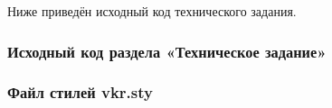 
Ниже приведён исходный код технического задания.

\subsubsection*{Исходный код раздела «Техническое задание»}



\subsubsection*{Файл стилей vkr.sty}


